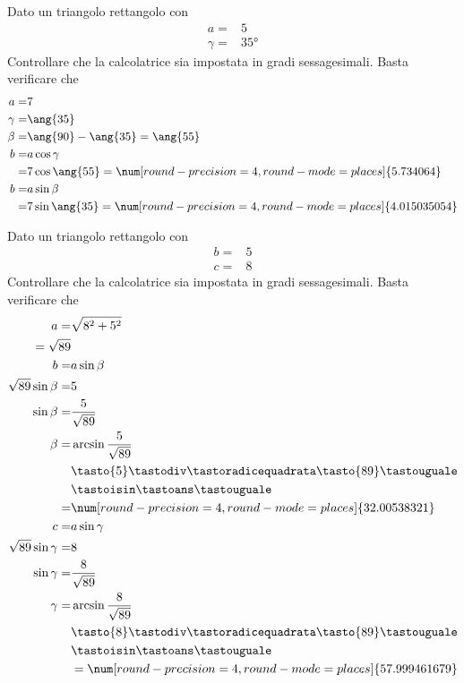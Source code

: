   \begin{exercise}
  	Dato un triangolo rettangolo con
  	\begin{align*}
  	a=&5\\
  	\gamma=&\ang{35}
  	\end{align*}
  	\tcblower
  	Controllare che la calcolatrice sia impostata in gradi sessagesimali.
  	Basta verificare che \testgradi 
  	\begin{align*}
  	a=& 7\\
  	\gamma=&\ang{35}\\
  	\beta=&\ang{90}-\ang{35}=\ang{55}\\
  	b=&a\cos\gamma\\
  	=& 7\cos\ang{55}=\num[round-precision=\lungarrotandamento,round-mode=places]{5.734064}\\
  	b=&a\sin\beta\\
  	=& 7\sin\ang{35}=\num[round-precision=\lungarrotandamento,round-mode=places]{4.015035054}
  	\end{align*}
  \end{exercise}
\begin{exercise}
	Dato un triangolo rettangolo con
	\begin{align*}
	b=&5\\
	c=&8
	\end{align*}
	\tcblower
	Controllare che la calcolatrice sia impostata in gradi sessagesimali.
	Basta verificare che \testgradi 
	\begin{align*}
	a=&\sqrt{8^2+5^2}\\
	=\sqrt{89}\\
	b=&a\sin\beta\\
	\sqrt{89}\sin\beta=&5\\
	\sin\beta=&\frac{5}{\sqrt{89}}\\
	\beta=&\arcsin\frac{5}{\sqrt{89}}\\
	&\tasto{5}\tastodiv\tastoradicequadrata\tasto{89}\tastouguale\\
	&\tastoisin\tastoans\tastouguale\\
	=&\num[round-precision=\lungarrotandamento,round-mode=places]{32.00538321}\\
	c=&a\sin\gamma\\
\sqrt{89}\sin\gamma=&8\\
\sin\gamma=&\frac{8}{\sqrt{89}}\\
\gamma=&\arcsin\frac{8}{\sqrt{89}}\\
&\tasto{8}\tastodiv\tastoradicequadrata\tasto{89}\tastouguale\\
&\tastoisin\tastoans\tastouguale\\
&=\num[round-precision=\lungarrotandamento,round-mode=places]{57.999461679}\\
	\end{align*}
\end{exercise}
